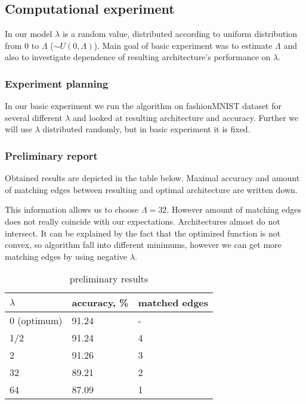 \documentclass{article}
\begin{document}
\subsection{Computational experiment}

In our model $\lambda$ is a random value, distributed according to uniform distribution from 0 to $\Lambda$ ($\sim U(0, \Lambda)$). Main goal of basic experiment was to estimate $\Lambda$ and also to investigate dependence of resulting architecture's performance on $\lambda$.

\subsubsection{Experiment planning}

In our basic experiment we run the algorithm on fashionMNIST dataset for several different $\lambda$ and looked at resulting architecture and accuracy. Further we will use $\lambda$ distributed randomly, but in basic experiment it is fixed.

\subsubsection{Preliminary report}

Obtained results are depicted in the table below. Maximal accuracy and amount of matching edges between resulting and optimal architecture are written down.

This information allows us to choose $\Lambda = 32$. However amount of matching edges does not really coincide with our expectations. Architectures almost do not intersect. It can be explained by the fact that the optimized function is not convex, so algorithm fall into different minimums, however we can get more matching edges by using negative $\lambda$. 

\begin{table}[h   ]
	\caption{preliminary results}
	\centering
	\begin{tabular}{lll}

		\midrule
		$\lambda$     & accuracy, \% & matched edges \\
		\midrule
        0 (optimum) & 91.24 & - \\ 
        1/2  & 91.24 &  4   \\
		2  & 91.26   &  3   \\
		32 & 89.21   &  2   \\
		64 & 87.09   &  1   \\
		\bottomrule
	\end{tabular}
	\label{tab:table}
\end{table}








\end{document}
